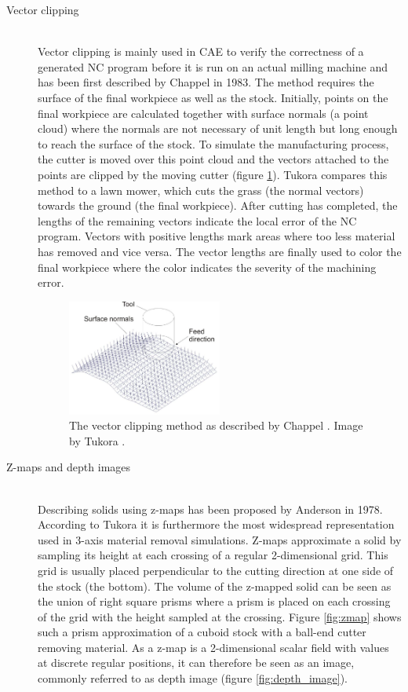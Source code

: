 \begin{description}
	\item[Vector clipping] \hfill \\
	Vector clipping is mainly used in CAE to verify the correctness of a generated NC program before it is run on an actual milling machine and has been first described by Chappel \cite{vector_clipping} in 1983.
	The method requires the surface of the final workpiece as well as the stock.
	Initially, points on the final workpiece are calculated together with surface normals (\ie a point cloud) where the normals are not necessary of unit length but long enough to reach the surface of the stock.
	To simulate the manufacturing process, the cutter is moved over this point cloud and the vectors attached to the points are clipped by the moving cutter (\cf figure \ref{fig:vector_clipping}).
	Tukora compares this method to a lawn mower, which cuts the grass (\ie the normal vectors) towards the ground (\ie the final workpiece).
	After cutting has completed, the lengths of the remaining vectors indicate the local error of the NC program.
	Vectors with positive lengths mark areas where too less material has removed and vice versa.
	The vector lengths are finally used to color the final workpiece where the color indicates the severity of the machining error. 
	
	\begin{figure}[H]
		\centering
		\includegraphics[width=0.5\textwidth]{images/vector_clipping}
		\caption{
			The vector clipping method as described by Chappel \cite{vector_clipping}.
			Image by Tukora \cite{virtual_machining_review}.
		}
		\label{fig:vector_clipping}
	\end{figure}
	 
	 
	\item[Z-maps and depth images] \hfill \\
	Describing solids using z-maps has been proposed by Anderson \cite{zmap} in 1978.
	According to Tukora it is furthermore the most widespread representation used in 3-axis material removal simulations.
	Z-maps approximate a solid by sampling its height at each crossing of a regular 2-dimensional grid.
	This grid is usually placed perpendicular to the cutting direction at one side of the stock (\eg the bottom).
	The volume of the z-mapped solid can be seen as the union of right square prisms where a prism is placed on each crossing of the grid with the height sampled at the crossing.
	Figure \ref{fig:zmap} shows such a prism approximation of a cuboid stock with a ball-end cutter removing material.
	As a z-map is a 2-dimensional scalar field with values at discrete regular positions, it can therefore be seen as an image, commonly referred to as depth image (\cf figure \ref{fig:depth_image}).
	

\end{description}
